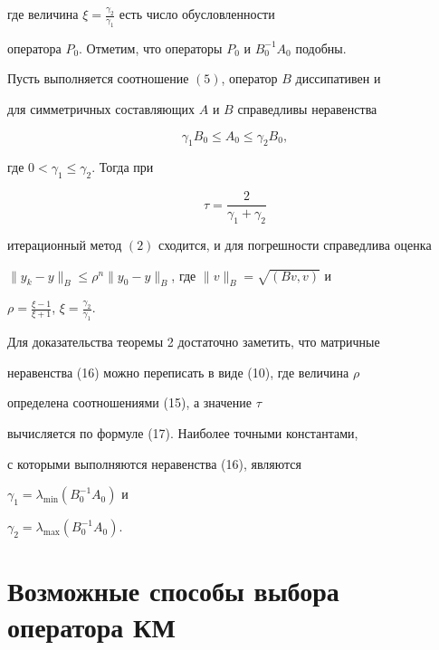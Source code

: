 где величина $\xi=\frac{\gamma_2}{\gamma_1}$ есть число обусловленности 


оператора $P_0$. Отметим, что операторы $P_0$ и $B^{-1}_0A_0$ подобны. 


 


\begin{thm} 


Пусть выполняется соотношение $(5)$, оператор $B$ диссипативен и 


для симметричных составляющих $A$ и $B$ справедливы неравенства 


\begin{equation} 


\gamma_1B_0\le A_0\le\gamma_2B_0, 


\end{equation} 


где $0<\gamma_1\le\gamma_2$. Тогда при 


\begin{equation} 


\tau=\frac{2}{\gamma_1+\gamma_2} 


\end{equation} 


итерационный метод $(2)$ сходится, и для погрешности справедлива оценка 


$\|y_k-y\|_B\le\rho^n\|y_0-y\|_B$, где $\|v\|_B=\sqrt{(B v,v)}$ и 


$\rho=\frac{\xi-1}{\xi+1}$, $\xi=\frac{\gamma_2}{\gamma_1}$.


\end{thm} 


 


Для доказательства теоремы 2 достаточно заметить, что матричные 


неравенства (16) можно переписать в виде (10), где величина $\rho$ 


определена соотношениями (15), а значение $\tau$ 


вычисляется по формуле (17). Наиболее точными константами, 


с которыми выполняются неравенства (16), являются 


$\gamma_1=\lambda_{\min}(B^{-1}_0A_0)$ и 


$\gamma_2=\lambda_{\max}(B^{-1}_0A_0)$. 


 


\section{Возможные способы выбора оператора КМ} 



